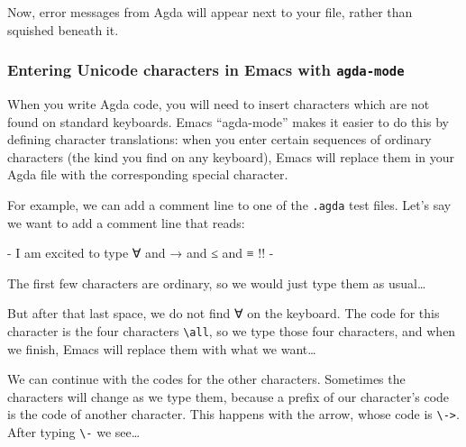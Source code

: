 Now, error messages from Agda will appear next to your file, rather than
squished beneath it.

\hypertarget{entering-unicode-characters-in-emacs-with-agda-mode}{%
\subsubsection{\texorpdfstring{Entering Unicode characters in Emacs with
\texttt{agda-mode}}{Entering Unicode characters in Emacs with agda-mode}}\label{entering-unicode-characters-in-emacs-with-agda-mode}}

When you write Agda code, you will need to insert characters which are
not found on standard keyboards. Emacs ``agda-mode'' makes it easier to
do this by defining character translations: when you enter certain
sequences of ordinary characters (the kind you find on any keyboard),
Emacs will replace them in your Agda file with the corresponding special
character.

For example, we can add a comment line to one of the \texttt{.agda} test
files. Let's say we want to add a comment line that reads:

\begin{myDisplay}
{- I am excited to type ∀ and → and ≤ and ≡ !! -}
\end{myDisplay}

The first few characters are ordinary, so we would just type them as
usual\ldots{}

\begin{myDisplay}
{- I am excited to type
\end{myDisplay}

But after that last space, we do not find ∀ on the keyboard. The code
for this character is the four characters \texttt{\textbackslash{}all},
so we type those four characters, and when we finish, Emacs will replace
them with what we want\ldots{}

\begin{myDisplay}
{- I am excited to type ∀
\end{myDisplay}

We can continue with the codes for the other characters. Sometimes the
characters will change as we type them, because a prefix of our
character's code is the code of another character. This happens with the
arrow, whose code is \texttt{\textbackslash{}-\textgreater{}}. After
typing \texttt{\textbackslash{}-} we see\ldots{}

\begin{myDisplay}
{- I am excited to type ∀ and
\end{myDisplay}

